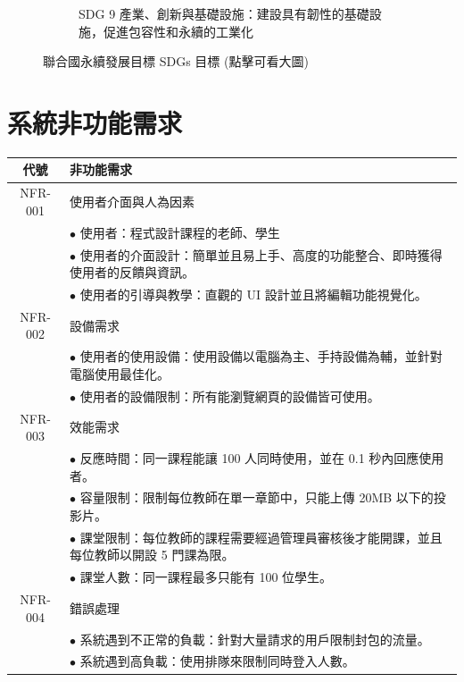 \documentclass[12pt]{article}
\begin{document}
\begin{figure}[H]
\begin{subfigure}{0.4\linewidth}
{    }
    \caption{SDG 9 產業、創新與基礎設施：建設具有韌性的基礎設施，促進包容性和永續的工業化}
  \end{subfigure}
  \label{arc2}
  \caption{聯合國永續發展目標 SDGs 目標 (點擊可看大圖)}
\end{figure}

\section{系統非功能需求}
\begin{table}[H]
  \centering
  \begin{tabular}{|c|p{15cm}|}
    \hline
    \textbf{代號} & \textbf{非功能需求} \\
    \hline
    NFR-001 & 使用者介面與人為因素 \\ 
    & $\bullet$ 使用者：程式設計課程的老師、學生 \\
    & $\bullet$ 使用者的介面設計：簡單並且易上手、高度的功能整合、即時獲得使用者的反饋與資訊。 \\
    & $\bullet$ 使用者的引導與教學：直觀的 UI 設計並且將編輯功能視覺化。\\
    \hline
    NFR-002 & 設備需求 \\
    & $\bullet$ 使用者的使用設備：使用設備以電腦為主、手持設備為輔，並針對電腦使用最佳化。\\
    & $\bullet$ 使用者的設備限制：所有能瀏覽網頁的設備皆可使用。\\
    \hline
    NFR-003 & 效能需求 \\
    & $\bullet$ 反應時間：同一課程能讓 100 人同時使用，並在 0.1 秒內回應使用者。\\
    & $\bullet$ 容量限制：限制每位教師在單一章節中，只能上傳 20MB 以下的投影片。\\
    & $\bullet$ 課堂限制：每位教師的課程需要經過管理員審核後才能開課，並且每位教師以開設 5 門課為限。\\
    & $\bullet$ 課堂人數：同一課程最多只能有 100 位學生。\\
    \hline
    NFR-004 & 錯誤處理 \\
    & $\bullet$ 系統遇到不正常的負載：針對大量請求的用戶限制封包的流量。\\
    & $\bullet$ 系統遇到高負載：使用排隊來限制同時登入人數。\\
    \hline
  \end{tabular}
\end{table}
\end{document}
